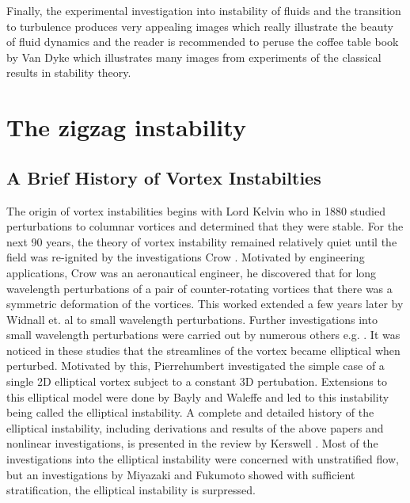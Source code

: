 Finally, the experimental investigation into instability of fluids and the transition to turbulence produces very appealing images which really illustrate the beauty of fluid dynamics and the reader is recommended to peruse the coffee table book by Van Dyke \cite{vandykealbum} which illustrates many images from experiments of the classical results in stability theory. 

\section{The zigzag instability}
\subsection{A Brief History of Vortex Instabilties}

The origin of vortex instabilities begins with Lord Kelvin who in 1880 studied perturbations to columnar vortices and determined that they were stable. For the next 90 years, the theory of vortex instability remained relatively quiet until the field was re-ignited by the investigations Crow \cite{crow1970}. Motivated by engineering applications, Crow was an aeronautical engineer, he discovered that for long wavelength perturbations of a pair of counter-rotating vortices that there was a symmetric deformation of the vortices. This worked extended a few years later by Widnall et. al \cite{widnall1974} to small wavelength perturbations. Further investigations into small wavelength perturbations were carried out by numerous others e.g. \cite{moore1975,tsai1976}. It was noticed in these studies that the streamlines of the vortex became elliptical when perturbed. Motivated by this, Pierrehumbert \cite{pierrehumbert1986} investigated the simple case of a single 2D elliptical vortex subject to a constant 3D pertubation. Extensions to this elliptical model were done by Bayly \cite{bayly1986} and Waleffe \cite{waleffe1990} and led to this instability being called the elliptical instability. A complete and detailed history of the elliptical instability, including derivations and results of the above papers and nonlinear investigations, is presented in the review by Kerswell \cite{kerswell2002}. Most of the investigations into the elliptical instability were concerned with unstratified flow, but an investigations by Miyazaki and Fukumoto \cite{miyazakifukumoto1992} showed with sufficient stratification, the elliptical instability is surpressed. 


